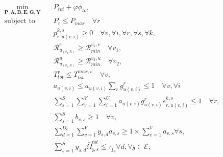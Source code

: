 \documentclass[conference]{IEEEtran}
\begin{document}
\begin{subequations}
\begin{alignat}{4}
\min\limits_{\boldsymbol{P}, \boldsymbol{A}, \boldsymbol{B}, \boldsymbol{E}, \boldsymbol{G}, \boldsymbol{Y} }   \quad &  P_{tot}+ \varphi \phi_{tot} \ \\
\text{subject to} \quad  &  P_r \leq P_{max} \quad \forall r
 \label{c11} \\
&p_{r,u(v,i)}^{k,s}  \geq 0  \quad \forall v,\forall i,\forall r,\forall s, \forall k,\label{c12} \\
&\mathcal{R}_{u_{(v_1,k)}}^e \geq  \mathcal{R}_{min}^{v_1,e} \quad \forall v_1, \label{c13} \\
&\mathcal{R}_{u_{(v_2,k)}}^u \geq  \mathcal{R}_{min}^{v_2,u} \quad \forall v_2, \label{c14} \\
&T_{tot}^v \leq T_{tot}^{max,v} \quad \forall v,\label{c15} \\
&a_{u(v,i)} \leq a_{u(v,i)}\sum_{r}g^r_{u(v,i)} \leq 1 \quad \forall v,\forall i  \\
& \sum_{s=1}^{S}\sum_{v=1}^{V}\sum_{i=1}^{U_v}a_{u(v,i)}g^r_{u(v,i)}e^{k,s}_{r,u(v,i)} \leq 1 \quad \forall r, \label{c21} \\
&  \sum_{s=1}^{S}b_{v,s} \geq 1 \quad \forall v,\\
& \textstyle  \sum_{d=1}^{D_c}\sum_{v=1}^{V}y_{s,d}a_{v,s} \geq 1\times\sum_{v=1}^{V}a_{v,s} \forall s,\label{c23} \\
 &\textstyle \sum_{s=1}^{S} y_{s,d} \bar{\Omega}_{\mathfrak{z},s}^{tot}  \leq   \tau_{\mathfrak{z}_d}  \forall d, \forall \mathfrak{z}\in \mathcal{E}; \label{c22}
\end{alignat}
\label{constraints}
\end{subequations}








\newpage
\newpage
\end{document}
